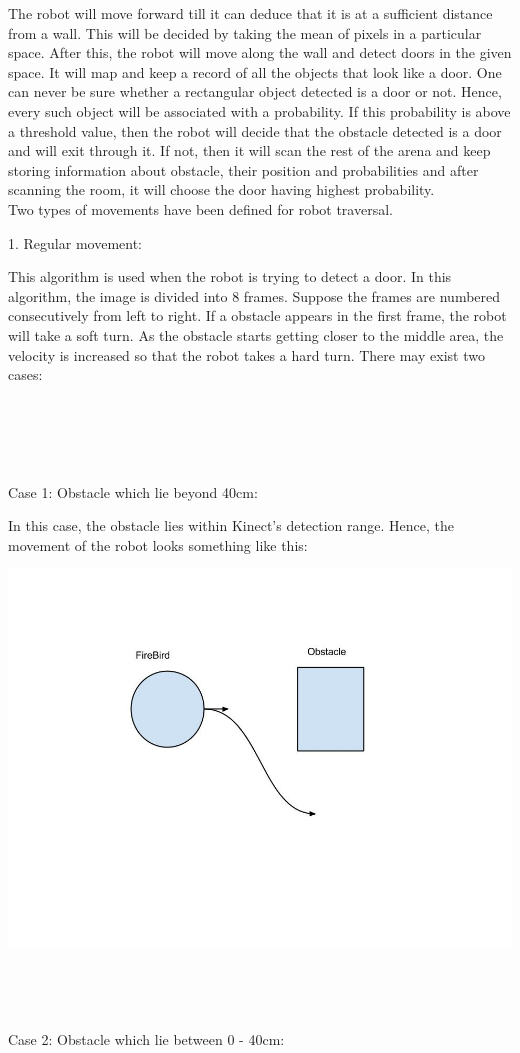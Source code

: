 \documentclass{report}
\begin{document}
The robot will move forward till it can deduce that it is at a sufficient distance from a wall. 
This will be decided by taking the mean of pixels in a particular space. After this, the robot
will move along the wall and detect doors in the given space. It will map and keep a record of all the objects that look 
like a door. One can never be sure whether a rectangular object detected is a door or not. Hence, 
every such object will be associated with a probability. If this probability is above a threshold 
value, then the robot will decide that the obstacle detected is a door and will exit through it. 
If not, then it will scan the rest of the arena and keep storing information about obstacle, their 
position and probabilities and after scanning the room, it will choose the door having highest
probability. \\

Two types of movements have been defined for robot traversal.

1. Regular movement:

This algorithm is used when the robot is trying to detect a door. In this algorithm, the image is divided into 8 frames. Suppose the frames are numbered consecutively from left to right. If a obstacle appears in the first frame, the robot will take a soft turn. As the obstacle starts getting closer to the middle area, the velocity is increased so that the robot takes a hard turn. There may exist two cases:
\\ \\ \\ \\ \\ \\
Case 1: Obstacle which lie beyond 40cm:

In this case, the obstacle lies within Kinect's detection range. Hence, the movement of the robot looks something like this:

\includegraphics[width = 20CM]{Case_1.jpg}
\\ \\ \\ \\ \\
Case 2: Obstacle which lie between 0 - 40cm:
\end{document}
